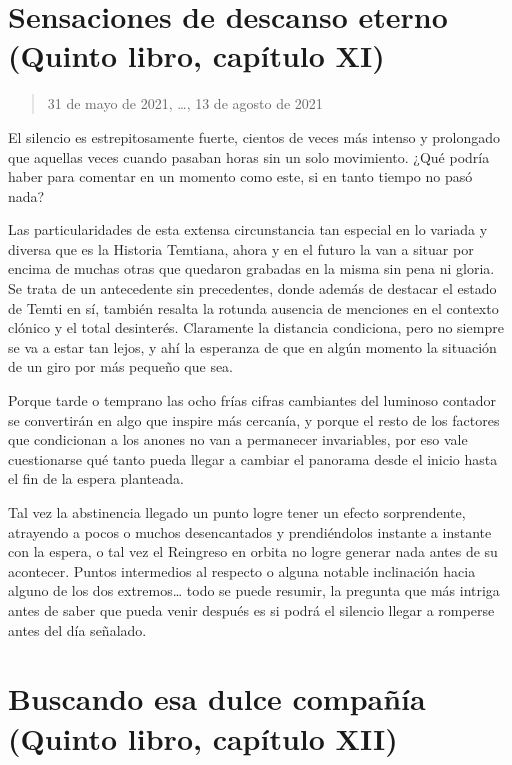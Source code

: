 \documentclass[
]{book}
\begin{document}
\hypertarget{sensaciones-de-descanso-eterno-quinto-libro-capuxedtulo-xi}{%
\section{Sensaciones de descanso eterno (Quinto libro, capítulo XI)}\label{sensaciones-de-descanso-eterno-quinto-libro-capuxedtulo-xi}}

\begin{quote}
31 de mayo de 2021, \ldots, 13 de agosto de 2021
\end{quote}

El silencio es estrepitosamente fuerte, cientos de veces más intenso y prolongado que aquellas veces cuando pasaban horas sin un solo movimiento. ¿Qué podría haber para comentar en un momento como este, si en tanto tiempo no pasó nada?

Las particularidades de esta extensa circunstancia tan especial en lo variada y diversa que es la Historia Temtiana, ahora y en el futuro la van a situar por encima de muchas otras que quedaron grabadas en la misma sin pena ni gloria. Se trata de un antecedente sin precedentes, donde además de destacar el estado de Temti en sí, también resalta la rotunda ausencia de menciones en el contexto clónico y el total desinterés. Claramente la distancia condiciona, pero no siempre se va a estar tan lejos, y ahí la esperanza de que en algún momento la situación de un giro por más pequeño que sea.

Porque tarde o temprano las ocho frías cifras cambiantes del luminoso contador se convertirán en algo que inspire más cercanía, y porque el resto de los factores que condicionan a los anones no van a permanecer invariables, por eso vale cuestionarse qué tanto pueda llegar a cambiar el panorama desde el inicio hasta el fin de la espera planteada.

Tal vez la abstinencia llegado un punto logre tener un efecto sorprendente, atrayendo a pocos o muchos desencantados y prendiéndolos instante a instante con la espera, o tal vez el Reingreso en orbita no logre generar nada antes de su acontecer. Puntos intermedios al respecto o alguna notable inclinación hacia alguno de los dos extremos\ldots{} todo se puede resumir, la pregunta que más intriga antes de saber que pueda venir después es si podrá el silencio llegar a romperse antes del día señalado.

\hypertarget{buscando-esa-dulce-compauxf1uxeda-quinto-libro-capuxedtulo-xii}{%
\section{Buscando esa dulce compañía (Quinto libro, capítulo XII)}\label{buscando-esa-dulce-compauxf1uxeda-quinto-libro-capuxedtulo-xii}}
\end{document}
